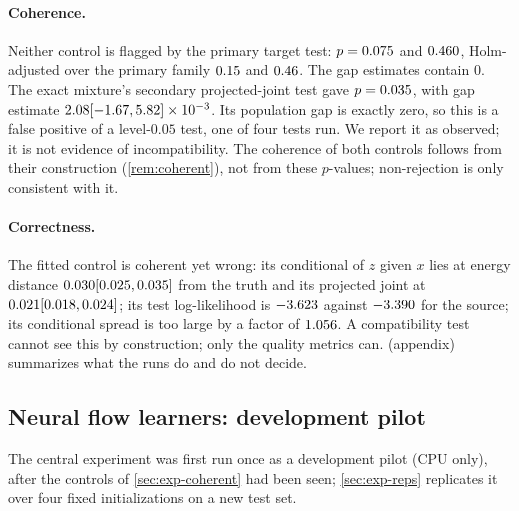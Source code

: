 \documentclass{article}
\theoremstyle{plain}
\theoremstyle{definition}
\theoremstyle{remark}
\begin{document}
\begin{table}[t]
\centering
\caption{Coherent-joint controls on the mixture probe (Test~P, $N=200$, $M=64$, $B=199$). $\widehat\Delta_T$ is the mean unbiased energy distance between the two branches. $D(\text{model},\text{truth})$ is the closed-form energy distance between the model's and the true conditional of $z$ given $x$, averaged over test examples. Both are standardized.}
\label{tab:synlearn}
\scriptsize
\setlength{\tabcolsep}{2pt}

\end{table}

\paragraph{Coherence.}
Neither control is flagged by the primary target test: $p=0.075$ and $0.460$, Holm-adjusted over the primary family $0.15$ and $0.46$. The gap estimates contain $0$.
The exact mixture's secondary projected-joint test gave $p=0.035$, with gap estimate $2.08 [-1.67, 5.82]\times10^{-3}$.
Its population gap is exactly zero, so this is a false positive of a level-$0.05$ test, one of four tests run. We report it as observed; it is not evidence of incompatibility.
The coherence of both controls follows from their construction (\cref{rem:coherent}), not from these $p$-values; non-rejection is only consistent with it.

\paragraph{Correctness.}
The fitted control is coherent yet wrong: its conditional of $z$ given $x$ lies at energy distance $0.030 [0.025, 0.035]$ from the truth and its projected joint at $0.021 [0.018, 0.024]$; its test log-likelihood is $-3.623$ against $-3.390$ for the source; its conditional spread is too large by a factor of $1.056$.
A compatibility test cannot see this by construction; only the quality metrics can.
 (appendix) summarizes what the runs do and do not decide.



\subsection{Neural flow learners: development pilot}
\label{sec:exp-real}
The central experiment was first run once as a development pilot (CPU only), after the controls of \cref{sec:exp-coherent} had been seen; \cref{sec:exp-reps} replicates it over four fixed initializations on a new test set.
\end{document}
